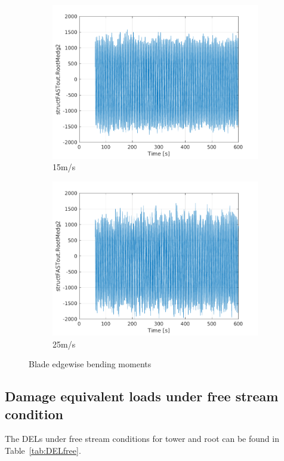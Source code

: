 \documentclass[10pt]{article}
\begin{document}
\begin{figure}[H]
\begin{subfigure}{0.40\textwidth}
  \includegraphics[width=1\linewidth]{../CIP_6/FAST/Plots_ws15/RootMedg2.png}
  \caption{15m/s}
\end{subfigure}
\begin{subfigure}{0.40\textwidth}
  \includegraphics[width=1\linewidth]{../CIP_6/FAST/Plots_ws25/RootMedg2.png}
  \caption{25m/s}
\end{subfigure}
\caption{Blade edgewise bending moments}
\label{fig:bladeedge}
\end{figure}

\subsection{Damage equivalent loads under free stream condition}
The DELs under free stream conditions for tower and root can be found in Table~\ref{tab:DELfree}.
\end{document}
